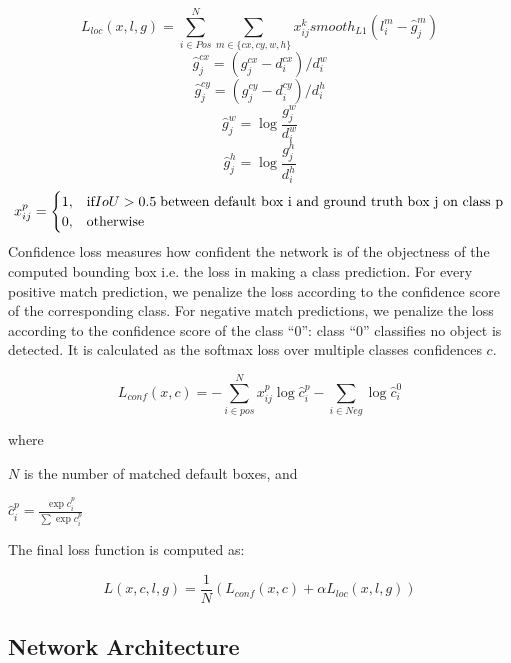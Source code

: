 \documentclass[12pt,letterpaper]{article}
\begin{document}
\[  L_{loc}(x,l,g) = \sum^{N}_{i \in Pos} \sum_{m \in \{cx,cy,w,h\}}x_{ij}^{k} smooth_{L1}(l_{i}^{m} - \widehat{g}_{j}^{m})    \]
\[\hat{g}_{j}^{cx}=(g_{j}^{cx}-d_{i}^{cx})/d_{i}^{w} \]
\[\hat{g}_{j}^{cy}=(g_{j}^{cy}-d_{i}^{cy})/d_{i}^{h}\]
\[ \hat{g}_{j}^{w} = \log{\frac{g_{j}^{w}}{d_{i}^{w}}} \]
\[\hat{g}_{j}^{h} = \log{\frac{g_{j}^{h}}{d_{i}^{h}}} \]
\[
    x_{ij}^{p} = 
    \begin{cases}
    1, & \text{if} IoU > 0.5 \; \textnormal{between default box i and ground truth box j on class p} \\
    0, & \text{otherwise}
    \end{cases}
    \]
Confidence loss measures how confident the network is of the objectness of the computed bounding box i.e. the loss in making a class prediction. For every positive match prediction, we penalize the loss according to the confidence score of the corresponding class. For negative match predictions, we penalize the loss according to the confidence score of the class “0”: class “0” classifies no object is detected. It is calculated as the softmax loss over multiple classes confidences $c$.

\[  L_{conf}(x,c) = -\sum_{i \in pos}^{N} x_{ij}^{p} \log{\hat{c}_{i}^{p}} - \sum_{i \in Neg}\log{\hat{c}_{i}^{0}}  \]

where

$N$ is the number of matched default boxes, and

$\hat{c}_{i}^{p} = \frac{\exp{c_{i}^{p}}}{\sum \exp{c_{i}^{p}}}$


The final loss function is computed as:

\[ L(x,c,l,g) = \frac{1}{N}(L_{conf}(x,c) + \alpha L_{loc}(x,l,g)) \]

\subsection{Network Architecture}
\end{document}
